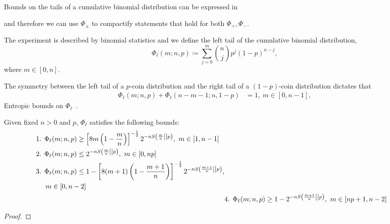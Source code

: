 Bounds on the tails of a cumulative binomial distribution can be expressed in

and therefore we can use $\Phi_{\pm}$ to compactify statements that hold for both $\Phi_+, \Phi_-$.

\iffalse
The experiment is described by binomial statistics and we define the left tail of the cumulative binomial distribution,
\begin{equation}\label{eq:phil}
	\Phi_\ell(m; n, p) \coloneqq \sum\limits_{j=0}^m \binom{n}{j} p^j (1-p)^{n-j},
\end{equation}
where $m\in [0,n]$. 

The symmetry between the left tail of a $p$-coin distribution and the right tail of a $(1-p)$-coin distribution dictates that
\begin{align}\label{eq:phi_reverse}
	\Phi_\ell(m; n, p) + \Phi_\ell(n-m-1; n, 1-p) &= 1,\ m\in [0,n-1],
\end{align}
Entropic bounds on $\Phi_\ell$~\cite{cit:ash}.
\begin{lemma}\label{lem:phil_bounds}
	Given fixed $n>0$ and $p$, $\Phi_\ell$ satisfies the following bounds:
	\begin{align*}
		\begin{split}
		&\text{1. } \Phi_\ell(m; n, p) \geq \left[ 8m\left(1-\frac{m}{n}\right) \right]^{-\frac{1}{2}} 2^{-n{S\left( \frac{m}{n} \middle\vert\middle\vert p \right)}},\ m\in [1,n-1] \\
		&\text{2. } \Phi_\ell(m; n, p) \leq 2^{-n{S\left( \frac{m}{n} \middle\vert\middle\vert p \right)}},\ m\in [0,np] \\
		&\text{3. } \Phi_\ell(m; n, p) \leq 1 - \left[ 8(m+1)\left(1-\frac{m+1}{n}\right) \right]^{-\frac{1}{2}} 2^{-nS\left( \frac{m+1}{n} \middle\vert\middle\vert p \right)}, \\
		&\hspace{14pt} m\in [0,n-2]
		\end{split}
		\\
		&\text{4. } \Phi_\ell(m; n, p) \geq 1 - 2^{-nS\left( \frac{m+1}{n} \middle\vert\middle\vert p \right)},\ m\in [np+1,n-2]
	\end{align*}
\end{lemma}
\begin{proof}
\end{proof}

